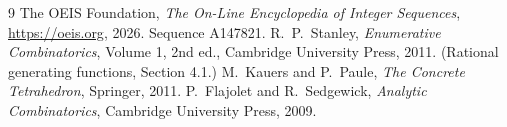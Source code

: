 \documentclass[11pt,a4paper]{article}
\theoremstyle{plain}
\theoremstyle{definition}
\begin{document}
\begin{thebibliography}{9}
 The OEIS Foundation, \emph{The On-Line Encyclopedia of Integer
Sequences}, \url{https://oeis.org}, 2026. Sequence A147821.
 R.~P.~Stanley, \emph{Enumerative Combinatorics}, Volume 1, 2nd ed.,
Cambridge University Press, 2011. (Rational generating functions, Section 4.1.)
 M.~Kauers and P.~Paule, \emph{The Concrete Tetrahedron}, Springer, 2011.
 P.~Flajolet and R.~Sedgewick, \emph{Analytic Combinatorics}, Cambridge
University Press, 2009.
\end{thebibliography}
\end{document}
